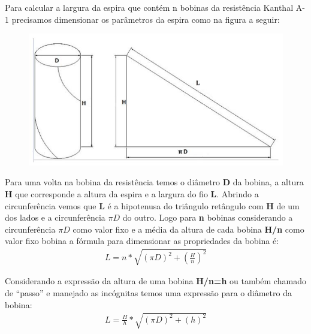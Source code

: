 Para calcular a largura da espira que contém n bobinas da resistência Kanthal A-1 precisamos dimensionar os parâmetros da espira como na figura a seguir:
\begin{figure}[ht]
	\centering
	\label{areaforno}
	\includegraphics[keepaspectratio=true,scale=1.0]{figuras/alimentacao3.JPG}
\end{figure}

Para uma volta na bobina da resistência temos o diâmetro \textbf{D} da bobina, a altura \textbf{H} que corresponde a altura da espira e a largura do fio \textbf{L}. Abrindo a circunferência vemos que \textbf{L} é a hipotenusa do triângulo retângulo com \textbf{H} de um dos lados e a circunferência \textbf{$\pi D$} do outro.
Logo para \textbf{n} bobinas considerando a circunferência \textbf{$\pi D$} como valor fixo e a média da altura de cada bobina \textbf{H/n} como valor fixo bobina  a fórmula para dimensionar as propriedades da bobina é:
\begin{gather}
    L = n * \sqrt{(\pi D)^{2} + \left(\frac{H}{n}\right)^{2}}
\end{gather}

Considerando a expressão da altura de uma bobina \textbf{H/n=h} ou também chamado de “passo” e manejado as incógnitas temos uma expressão para o diâmetro da bobina:
\begin{gather}
    L = \frac{H}{h} * \sqrt{(\pi D)^{2} + \left(h\right)^{2}}
\end{gather}

